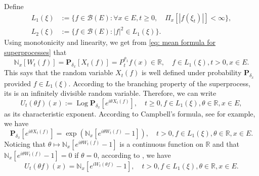 \documentclass[12pt,a4paper]{amsart}
\theoremstyle{plain}
\theoremstyle{definition}
\numberwithin{equation}{section}
\begin{document}
    Define
\begin{equation}\begin{split}
    L_1(\xi)
    &:= \{f\in \mathcal B(E): \forall x\in E, t\geq 0, \quad \Pi_x[|f(\xi_t)|]< \infty\},
    \\L_2(\xi)
    &:= \{f \in \mathcal B(E): |f|^2 \in L_1(\xi)\}.
\end{split}\end{equation}
    Using monotonicity and linearity, we get from \eqref{eq: mean formula for superprocesses}  that
\begin{equation}
    \mathbb N_x[W_t(f)]
    =\mathbf P_{\delta_x}[X_t(f)]=P^{\rho_1}_t f(x) \in \mathbb R,
    \quad f\in L_1(\xi), t > 0,x\in E.
\end{equation}
    This says that the random variable $X_t(f)$ is well defined under probability $\mathbf P_{\delta_x}$ provided $f\in L_1(\xi)$.
    According to the branching property of the superprocess, its is an infinitely divisible random variable.
    Therefore, we can write
\[
    U_t(\theta f)(x) := \operatorname{Log} \mathbf P_{\delta_x}[e^{i \theta X_t(f)}],
    \quad t\geq 0, f\in L_1(\xi), \theta \in \mathbb R, x\in E,
\]
    as its characteristic exponent.
    According to Campbell's formula, see \cite[Theorem 2.7]{Kyprianou2014Fluctuations} for example, we have
\[
    \mathbf P_{\delta_x} [e^{i\theta X_t(f)}]
    = \exp(\mathbb N_x[ e^{i\theta W_t(f)} - 1]),
    \quad t>0, f\in L_1(\xi), \theta \in \mathbb R, x\in E.
\]
    Noticing that $\theta \mapsto \mathbb N_x[e^{i\theta W_t(f)} - 1]$ is a continuous function on $\mathbb R$ and that $\mathbb N_x[e^{i\theta W_t(f)} - 1] = 0$ if $\theta = 0$, according to \cite[Lemma 7.6]{Sato2013Levy}, we have
\begin{equation}
\label{eq: N and characteristic exponent}
    U_t(\theta f)(x) = \mathbb N_x[e^{i W_t(\theta f)} - 1],
    \quad t>0, f\in L_1(\xi), \theta \in \mathbb R, x\in E.
\end{equation}
\end{document}
